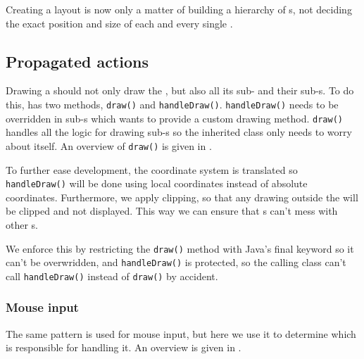 
Creating a layout is now only a matter of building a hierarchy of
s, not deciding the exact position and size of each and every
single .

\subsection{Propagated actions}
\label{sec:actions}

Drawing a  should not only draw the , but also
all its sub- and their sub-s. To do this,
 has two methods, \texttt{draw()} and \texttt{handleDraw()}.
\texttt{handleDraw()} needs to be overridden in sub-s which
wants to provide a custom drawing method. \texttt{draw()} handles all the logic
for drawing sub-s so the inherited class only needs to worry
about itself. An overview of \texttt{draw()} is given in
.

 


To further ease development, the coordinate system is translated so
\texttt{handleDraw()} will be done using local coordinates instead of absolute
coordinates.  Furthermore, we apply clipping, so that any drawing outside the
 will be clipped and not displayed. This way we can ensure that
s can't mess with other s.

We enforce this by restricting the \texttt{draw()} method with Java's final
keyword so it can't be overwridden, and \texttt{handleDraw()} is protected, so
the calling class can't call \texttt{handleDraw()} instead of \texttt{draw()} by
accident.

\subsubsection{Mouse input}

The same pattern is used for mouse input, but here we use it to determine which
 is responsible for handling it. An overview is given in
.

